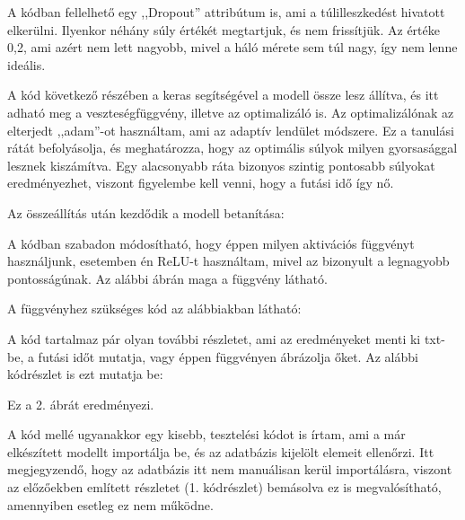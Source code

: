 \documentclass[hidelinks,12pt,a4paper]{report}
\begin{document}
A kódban fellelhető egy ,,Dropout” attribútum is, ami a túlilleszkedést hivatott elkerülni. Ilyenkor néhány súly értékét megtartjuk, és nem frissítjük. Az értéke 0,2, ami azért nem lett nagyobb, mivel a háló mérete sem túl nagy, így nem lenne ideális.




A kód következő részében a keras segítségével a modell össze lesz állítva, és itt adható meg a veszteségfüggvény, illetve az optimalizáló is.
Az optimalizálónak az elterjedt ,,adam”-ot használtam, ami az adaptív lendület módszere. Ez a tanulási rátát befolyásolja, és meghatározza, hogy az optimális súlyok milyen gyorsasággal lesznek kiszámítva. Egy alacsonyabb ráta bizonyos szintig pontosabb súlyokat eredményezhet, viszont figyelembe kell venni, hogy a futási idő így nő.


Az összeállítás után kezdődik a modell betanítása:


A kódban szabadon módosítható, hogy éppen milyen aktivációs függvényt használjunk, esetemben én ReLU-t használtam, mivel az bizonyult a legnagyobb pontosságúnak. Az alábbi ábrán maga a függvény látható.


A függvényhez szükséges kód az alábbiakban látható:


A kód tartalmaz pár olyan további részletet, ami az eredményeket menti ki txt-be, a futási időt mutatja, vagy éppen függvényen ábrázolja őket. Az alábbi kódrészlet is ezt mutatja be:


Ez a 2. ábrát eredményezi.



A kód mellé ugyanakkor egy kisebb, tesztelési kódot is írtam, ami a már elkészített modellt importálja be, és az adatbázis kijelölt elemeit ellenőrzi.
Itt megjegyzendő, hogy az adatbázis itt nem manuálisan kerül importálásra, viszont az előzőekben említett részletet (1. kódrészlet) bemásolva ez is megvalósítható, amennyiben esetleg ez nem működne.
\end{document}
